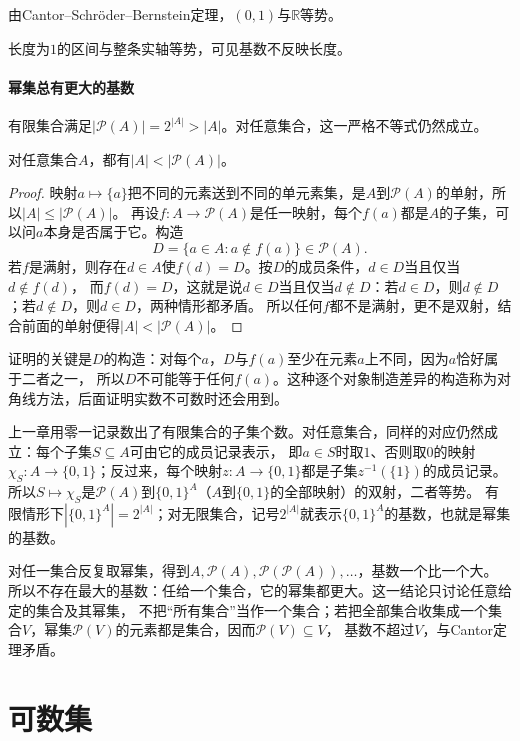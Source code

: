 由Cantor--Schröder--Bernstein定理，$(0,1)$与$\mathbb R$等势。

长度为$1$的区间与整条实轴等势，可见基数不反映长度。

\paragraph{幂集总有更大的基数}
有限集合满足$|\mathcal P(A)|=2^{|A|}>|A|$。对任意集合，这一严格不等式仍然成立。
\begin{theorem}[Cantor定理]
\label{thm:comb-cantor-power-set}
对任意集合$A$，都有$|A|<|\mathcal P(A)|$。
\end{theorem}
\begin{proof}
映射$a\mapsto\{a\}$把不同的元素送到不同的单元素集，是$A$到$\mathcal P(A)$的单射，所以$|A|\leq|\mathcal P(A)|$。
再设$f:A\to\mathcal P(A)$是任一映射，每个$f(a)$都是$A$的子集，可以问$a$本身是否属于它。构造
\[
 D=\{a\in A:a\notin f(a)\}\in\mathcal P(A).
\]
若$f$是满射，则存在$d\in A$使$f(d)=D$。按$D$的成员条件，$d\in D$当且仅当$d\notin f(d)$，
而$f(d)=D$，这就是说$d\in D$当且仅当$d\notin D$：若$d\in D$，则$d\notin D$；若$d\notin D$，则$d\in D$，两种情形都矛盾。
所以任何$f$都不是满射，更不是双射，结合前面的单射便得$|A|<|\mathcal P(A)|$。
\end{proof}
证明的关键是$D$的构造：对每个$a$，$D$与$f(a)$至少在元素$a$上不同，因为$a$恰好属于二者之一，
所以$D$不可能等于任何$f(a)$。这种逐个对象制造差异的构造称为对角线方法，后面证明实数不可数时还会用到。

上一章用零一记录数出了有限集合的子集个数。对任意集合，同样的对应仍然成立：每个子集$S\subseteq A$可由它的成员记录表示，
即$a\in S$时取$1$、否则取$0$的映射$\chi_S:A\to\{0,1\}$；反过来，每个映射$z:A\to\{0,1\}$都是子集$z^{-1}(\{1\})$的成员记录。
所以$S\mapsto\chi_S$是$\mathcal P(A)$到$\{0,1\}^A$（$A$到$\{0,1\}$的全部映射）的双射，二者等势。
有限情形下$|\{0,1\}^A|=2^{|A|}$；对无限集合，记号$2^{|A|}$就表示$\{0,1\}^A$的基数，也就是幂集的基数。

对任一集合反复取幂集，得到$A,\mathcal P(A),\mathcal P(\mathcal P(A)),\ldots$，基数一个比一个大。
所以不存在最大的基数：任给一个集合，它的幂集都更大。这一结论只讨论任意给定的集合及其幂集，
不把“所有集合”当作一个集合；若把全部集合收集成一个集合$V$，幂集$\mathcal P(V)$的元素都是集合，因而$\mathcal P(V)\subseteq V$，
基数不超过$V$，与Cantor定理矛盾。

\section{可数集}
\label{sec:comb-countable-sets}

